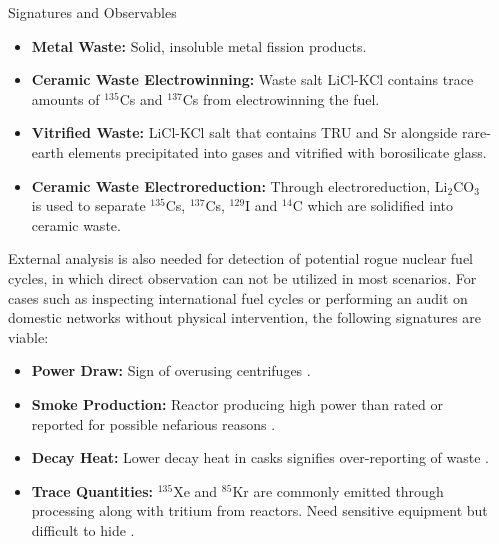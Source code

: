 \documentclass[final]{beamer}
\newlength{\sepwid}
\newlength{\onecolwid}
\newlength{\threecolwid}
\begin{document}
\begin{frame}[t]
\begin{columns}[t,totalwidth=\threecolwid]
\begin{column}{\onecolwid}
\begin{block}{Signatures and Observables}
	\begin{itemize}
		\item \textbf{Metal Waste:} Solid, insoluble metal fission products.
		\item \textbf{Ceramic Waste Electrowinning:} Waste salt LiCl-KCl contains trace amounts of $^{135}$Cs and $^{137}$Cs from
		electrowinning the fuel.
		\item \textbf{Vitrified Waste:} LiCl-KCl salt that contains TRU and Sr alongside rare-earth elements precipitated into gases
		and vitrified with borosilicate glass.
		\item \textbf{Ceramic Waste Electroreduction:} Through electroreduction, Li$_2$CO$_3$ is used to separate $^{135}$Cs, $^{137}$Cs, 
		$^{129}$I and $^{14}$C which are solidified into ceramic waste.
	\end{itemize}

		External analysis is also needed for detection of potential rogue nuclear fuel cycles, in which direct observation can not be
		utilized in most scenarios. For cases such as inspecting international fuel cycles or performing an audit on domestic networks
		without physical intervention, the following signatures are viable:
		
	\begin{itemize}
		\item \textbf{Power Draw:} Sign of overusing centrifuges \cite{Yilmaz_2016,Hou_2016}.
		\item \textbf{Smoke Production:} Reactor producing high power than rated or reported for possible
		nefarious reasons \cite{Yilmaz_2016}.
		\item \textbf{Decay Heat:} Lower decay heat in casks signifies over-reporting of waste \cite{Kemp_2016}.
		\item \textbf{Trace Quantities:} $^{135}$Xe and $^{85}$Kr are commonly emitted through processing along with tritium
		from reactors. Need sensitive equipment but difficult to hide \cite{Borrelli_2017,Kemp_2016}.
	\end{itemize}
	
\end{block}


\end{column} %

\begin{column}{\sepwid}\end{column} %



\end{columns}
\end{frame}
\end{document}
